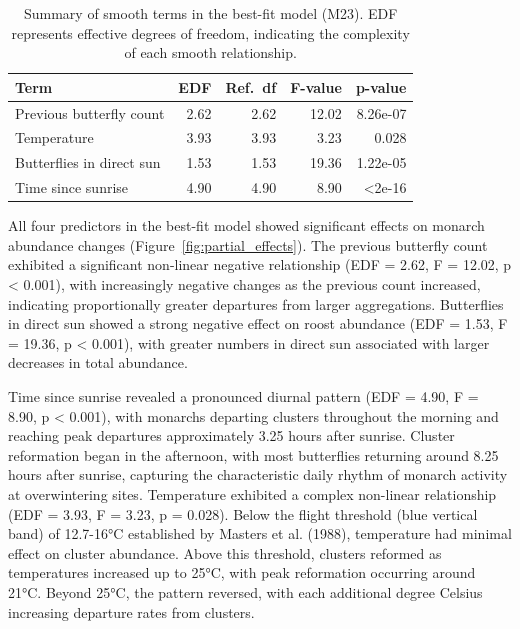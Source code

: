 \begin{table}[htbp]
\centering
\caption{Summary of smooth terms in the best-fit model (M23). EDF represents effective degrees of freedom, indicating the complexity of each smooth relationship.}\label{tab:smooth_terms}
\begin{tabular}{lrrrr}
\hline
Term & EDF & Ref.~df & F-value & p-value \\
\hline
Previous butterfly count & 2.62 & 2.62 & 12.02 & 8.26e-07 \\
Temperature & 3.93 & 3.93 & 3.23 & 0.028 \\
Butterflies in direct sun & 1.53 & 1.53 & 19.36 & 1.22e-05 \\
Time since sunrise & 4.90 & 4.90 & 8.90 & <2e-16 \\
\hline
\end{tabular}
\end{table}

All four predictors in the best-fit model showed significant effects on monarch abundance changes (Figure~\ref{fig:partial_effects}). The previous butterfly count exhibited a significant non-linear negative relationship (EDF = 2.62, F = 12.02, p < 0.001), with increasingly negative changes as the previous count increased, indicating proportionally greater departures from larger aggregations. Butterflies in direct sun showed a strong negative effect on roost abundance (EDF = 1.53, F = 19.36, p < 0.001), with greater numbers in direct sun associated with larger decreases in total abundance.

Time since sunrise revealed a pronounced diurnal pattern (EDF = 4.90, F = 8.90, p < 0.001), with monarchs departing clusters throughout the morning and reaching peak departures approximately 3.25 hours after sunrise. Cluster reformation began in the afternoon, with most butterflies returning around 8.25 hours after sunrise, capturing the characteristic daily rhythm of monarch activity at overwintering sites. Temperature exhibited a complex non-linear relationship (EDF = 3.93, F = 3.23, p = 0.028). Below the flight threshold (blue vertical band) of 12.7-16°C established by Masters et al. (1988), temperature had minimal effect on cluster abundance. Above this threshold, clusters reformed as temperatures increased up to 25°C, with peak reformation occurring around 21°C. Beyond 25°C, the pattern reversed, with each additional degree Celsius increasing departure rates from clusters.

